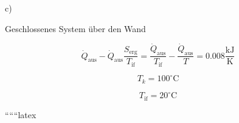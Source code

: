 c)

Geschlossenes System über den Wand

\[
\dot{Q}_{\text{aus}} - \dot{Q}_{\text{aus}} \frac{S_{\text{erg}}}{T_{\text{if}}} = \frac{\dot{Q}_{\text{aus}}}{T_{\text{if}}} - \frac{\dot{Q}_{\text{aus}}}{T} = 0.008 \frac{\text{kJ}}{\text{K}}
\]

\[
T_k = 100^\circ \text{C}
\]

\[
T_{\text{if}} = 20^\circ \text{C}
\]

``````latex